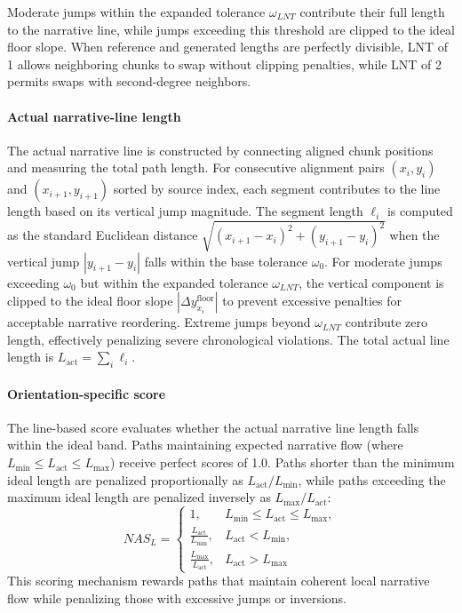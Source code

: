 \documentclass[main.tex]{subfiles}
\begin{document}
Moderate jumps within the expanded tolerance $\omega_{LNT}$ contribute their full length to the narrative line, while jumps exceeding this threshold are clipped to the ideal floor slope. When reference and generated lengths are perfectly divisible, LNT of 1 allows neighboring chunks to swap without clipping penalties, while LNT of 2 permits swaps with second-degree neighbors.

\paragraph{Actual narrative-line length}
The actual narrative line is constructed by connecting aligned chunk positions and measuring the total path length. For consecutive alignment pairs $(x_i, y_i)$ and $(x_{i+1}, y_{i+1})$ sorted by source index, each segment contributes to the line length based on its vertical jump magnitude. The segment length $\ell_i$ is computed as the standard Euclidean distance $\sqrt{(x_{i+1} - x_i)^2 + (y_{i+1} - y_i)^2}$ when the vertical jump $|y_{i+1} - y_i|$ falls within the base tolerance $\omega_0$. For moderate jumps exceeding $\omega_0$ but within the expanded tolerance $\omega_{LNT}$, the vertical component is clipped to the ideal floor slope $|\Delta y_{x_i}^{\text{floor}}|$ to prevent excessive penalties for acceptable narrative reordering. Extreme jumps beyond $\omega_{LNT}$ contribute zero length, effectively penalizing severe chronological violations. The total actual line length is $L_{\text{act}} = \sum_i \ell_i$.

\paragraph{Orientation-specific score}
The line-based score evaluates whether the actual narrative line length falls within the ideal band. Paths maintaining expected narrative flow (where $L_{\min} \leq L_{\text{act}} \leq L_{\max}$) receive perfect scores of 1.0. Paths shorter than the minimum ideal length are penalized proportionally as $L_{\text{act}}/L_{\min}$, while paths exceeding the maximum ideal length are penalized inversely as $L_{\max}/L_{\text{act}}$:
\begin{equation}
NAS_L = \begin{cases}
1, & L_{\min} \leq L_{\text{act}} \leq L_{\max}, \\
\frac{L_{\text{act}}}{L_{\min}}, & L_{\text{act}} < L_{\min}, \\
\frac{L_{\max}}{L_{\text{act}}}, & L_{\text{act}} > L_{\max}
\end{cases}
\end{equation}
This scoring mechanism rewards paths that maintain coherent local narrative flow while penalizing those with excessive jumps or inversions.
\end{document}
